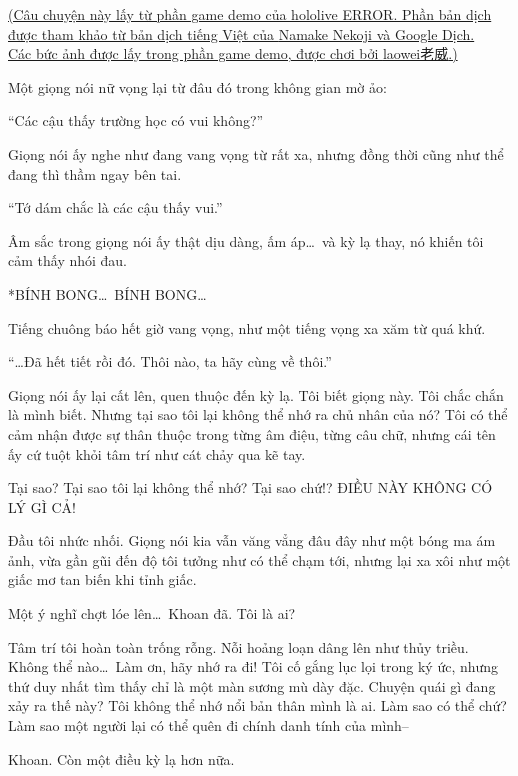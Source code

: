 \documentclass[../main.tex]{subfiles}
\begin{document}
\begin{center}
  \uline{(Câu chuyện này lấy từ phần game demo của hololive ERROR. Phần bản dịch được tham khảo từ bản dịch tiếng Việt của \href{https://www.youtube.com/@namakenekoji2023}{Namake Nekoji} và Google Dịch.\\Các bức ảnh được lấy trong phần game demo, được chơi bởi \href{https://www.youtube.com/@weiweilim}{laowei老威}.)}
\end{center}


Một giọng nói nữ vọng lại từ đâu đó trong không gian mờ ảo:

``Các cậu thấy trường học có vui không?''

Giọng nói ấy nghe như đang vang vọng từ rất xa, nhưng đồng thời cũng như thể đang thì thầm ngay bên tai.

``Tớ dám chắc là các cậu thấy vui.''

Âm sắc trong giọng nói ấy thật dịu dàng, ấm áp\dots\ và kỳ lạ thay, nó khiến tôi cảm thấy nhói đau.

*BÍNH BONG\dots\ BÍNH BONG\dots*

Tiếng chuông báo hết giờ vang vọng, như một tiếng vọng xa xăm từ quá khứ.

``\dots Đã hết tiết rồi đó. Thôi nào, ta hãy cùng về thôi.''

Giọng nói ấy lại cất lên, quen thuộc đến kỳ lạ. Tôi biết giọng này. Tôi chắc chắn là mình biết. Nhưng tại sao tôi lại không thể nhớ ra chủ nhân của nó? Tôi có thể cảm nhận được sự thân thuộc trong từng âm điệu, từng câu chữ, nhưng cái tên ấy cứ tuột khỏi tâm trí như cát chảy qua kẽ tay.

Tại sao? Tại sao tôi lại không thể nhớ? Tại sao chứ!? ĐIỀU NÀY KHÔNG CÓ LÝ GÌ CẢ!

Đầu tôi nhức nhối. Giọng nói kia vẫn văng vẳng đâu đây như một bóng ma ám ảnh, vừa gần gũi đến độ tôi tưởng như có thể chạm tới, nhưng lại xa xôi như một giấc mơ tan biến khi tỉnh giấc.

Một ý nghĩ chợt lóe lên\dots\ Khoan đã. Tôi là ai?

Tâm trí tôi hoàn toàn trống rỗng. Nỗi hoảng loạn dâng lên như thủy triều. Không thể nào\dots\ Làm ơn, hãy nhớ ra đi! Tôi cố gắng lục lọi trong ký ức, nhưng thứ duy nhất tìm thấy chỉ là một màn sương mù dày đặc. Chuyện quái gì đang xảy ra thế này? Tôi không thể nhớ nổi bản thân mình là ai. Làm sao có thể chứ? Làm sao một người lại có thể quên đi chính danh tính của mình--

Khoan. Còn một điều kỳ lạ hơn nữa.
\end{document}
